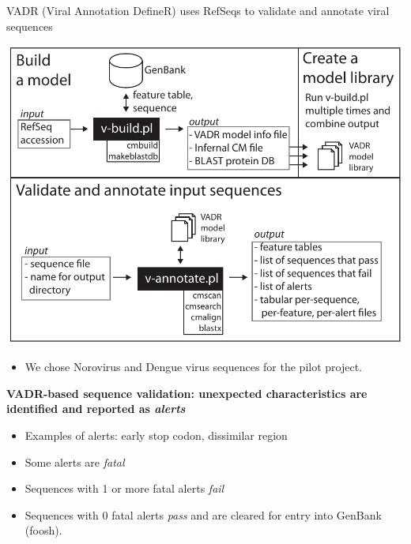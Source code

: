 \documentclass[landscape]{slides}
\begin{document}
\begin{slide}
\begin{center}
VADR (Viral Annotation DefineR) uses RefSeqs to validate and
annotate viral sequences

\includegraphics[width=7in]{figs/vadr}
\end{center}

\small
\begin{itemize}
  \item We chose Norovirus and Dengue virus sequences for the pilot
    project.
\end{itemize}



\vfill
\end{slide}
\begin{slide}
\begin{center}
\textbf{VADR-based sequence validation: unexpected characteristics are identified and reported 
  as \emph{alerts}}
\end{center}

\scriptsize
\begin{itemize}
\item Examples of alerts: early stop codon, dissimilar region
\item Some alerts are \emph{fatal}
\item Sequences with 1 or more fatal alerts \emph{fail}
\item Sequences with 0 fatal alerts \emph{pass} and are cleared for
  entry into GenBank (foosh).
\end{itemize}

\vfill
\end{slide}
\end{document}
